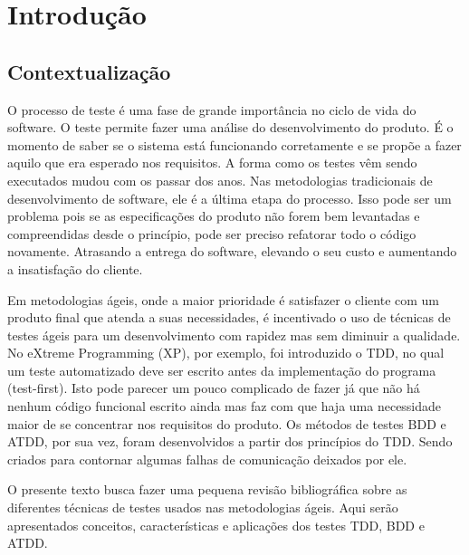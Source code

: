 \chapter{Introdução}\label{CAP:introducao}
\section{Contextualização}
    O processo de teste é uma fase de grande importância no ciclo de vida do software. O teste permite fazer uma análise do desenvolvimento do produto.
É o momento de saber se o sistema está funcionando corretamente e se propõe a fazer aquilo que era esperado nos requisitos. A forma como os testes vêm
sendo executados mudou com os passar dos anos. Nas metodologias tradicionais de desenvolvimento de software, ele é a última etapa do processo. Isso pode
ser um problema pois se as especificações do produto não forem bem levantadas e compreendidas desde o princípio, pode ser preciso refatorar todo o código novamente. Atrasando a entrega do software, elevando o seu custo e aumentando a insatisfação do cliente. 

    Em metodologias ágeis, onde a maior prioridade é satisfazer o cliente com um produto final que atenda a suas necessidades, é incentivado o uso de
técnicas de testes ágeis para um desenvolvimento com rapidez mas sem diminuir a qualidade. No eXtreme Programming (XP), por exemplo, foi introduzido o
TDD, no qual um teste automatizado deve ser escrito antes da implementação do programa (test-first). Isto pode parecer um pouco complicado de fazer já
que não há nenhum código funcional escrito ainda mas faz com que haja uma necessidade maior de se concentrar nos requisitos do produto. Os métodos de
testes BDD e ATDD, por sua vez, foram desenvolvidos a partir dos princípios do TDD. Sendo criados para contornar algumas falhas de comunicação deixados
por ele. 

    O presente texto busca fazer uma pequena revisão bibliográfica sobre as diferentes técnicas de testes usados nas metodologias ágeis. Aqui serão
apresentados conceitos, características e aplicações dos testes TDD, BDD e ATDD.
